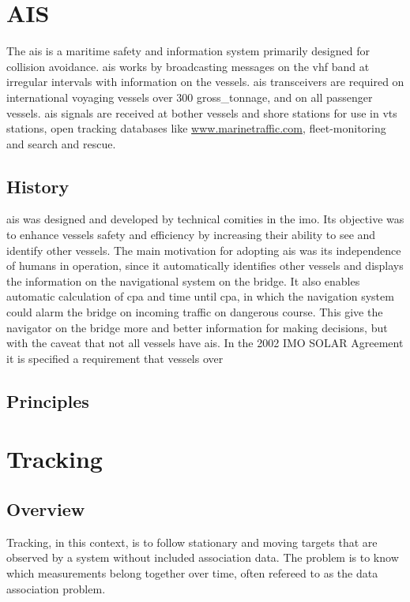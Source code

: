 \section{AIS}
The \acrfull{ais} is a maritime safety and information system primarily designed for collision avoidance. \gls{ais} works by broadcasting messages on the \gls{vhf} band at irregular intervals with information on the vessels. \gls{ais} transceivers are required on international voyaging vessels over 300 \gls{gross_tonnage}, and on all passenger vessels. \gls{ais} signals are received at bother vessels and shore stations for use in \gls{vts} stations, open tracking databases like \url{www.marinetraffic.com}, fleet-monitoring and search and rescue.

\subsection{History}
\gls{ais} was designed and developed by technical comities in the \gls{imo}. Its objective was to enhance vessels safety and efficiency by increasing their ability to see and identify other vessels. The main motivation for adopting \gls{ais} was its independence of humans in operation, since it automatically identifies other vessels and displays the information on the navigational system on the bridge. It also enables automatic calculation of \gls{cpa} and time until \gls{cpa}, in which the navigation system could alarm the bridge on incoming traffic on dangerous course. This give the navigator on the bridge more and better information for making decisions, but with the caveat that not all vessels have \gls{ais}. In the 2002 IMO SOLAR Agreement it is specified a requirement that vessels over

\subsection{Principles}


\section{Tracking}
\subsection{Overview}
Tracking, in this context, is to follow stationary and moving targets that are observed by a system without included association data. The problem is to know which measurements belong together over time, often refereed to as the data association problem. 

